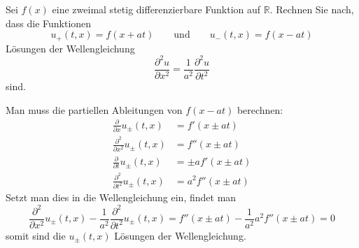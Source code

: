 Sei $f(x)$ eine zweimal stetig differenzierbare Funktion auf $\mathbb R$.
Rechnen Sie nach, dass die Funktionen
\[
u_+(t,x)=f(x+at)
\qquad
\text{und}
\qquad
u_-(t,x)=f(x-at)
\]
Lösungen der Wellengleichung
\[
\frac{\partial^2 u}{\partial x^2}=\frac1{a^2}\frac{\partial^2 u}{\partial t^2}
\]
sind.

\begin{loesung}
Man muss die partiellen Ableitungen von $f(x-at)$ berechnen:
\begin{align*}
\frac{\partial}{\partial x}u_{\pm}(t,x)
&=f'(x\pm at)
\\
\frac{\partial^2}{\partial x^2}u_{\pm}(t,x)
&=f''(x\pm at)
\\
\frac{\partial}{\partial t}u_{\pm}(t,x)
&=\pm af'(x\pm at)
\\
\frac{\partial^2}{\partial t^2}u_{\pm}(t,x)
&=a^2f''(x\pm at)
\end{align*}
Setzt man dies in die Wellengleichung ein, findet man
\[
\frac{\partial^2}{\partial x^2}u_{\pm}(t,x)
-\frac1{a^2}\frac{\partial^2}{\partial t^2}u_{\pm}(t,x)
=f''(x\pm at)
-\frac1{a^2} a^2f''(x\pm at)=0
\]
somit sind die $u_{\pm}(t,x)$ Lösungen der Wellengleichung.
\end{loesung}
